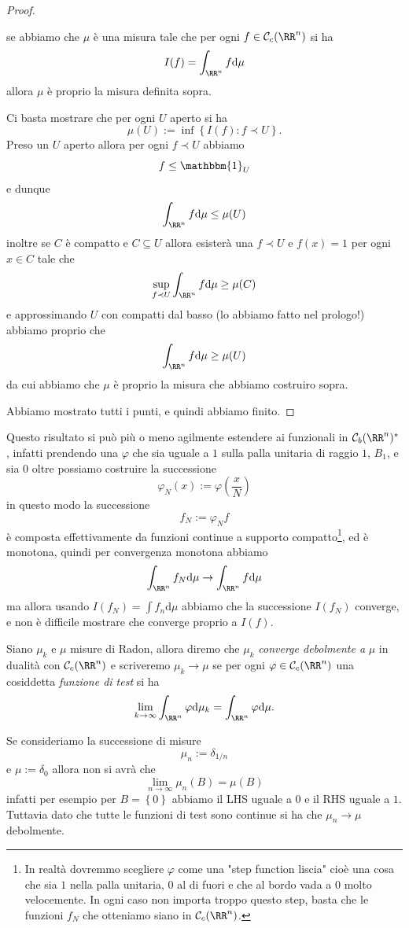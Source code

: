 \documentclass[11pt]{scrartcl}
\newcommand{\dif}{\text{d}}
\begin{document}
\begin{proof}
\begin{claim}
			se abbiamo che $\mu$ è una misura tale che per ogni $f\in \mathcal{C}_c(\RR^n)$ si ha
			$$I(f)=\int_{\RR^n} f\dif \mu$$
			allora $\mu$ è proprio la misura definita sopra.
		\end{claim}
		\begin{subproof}[Sottodimostrazione]
			Ci basta mostrare che per ogni $U$ aperto si ha
			$$\mu(U):=\inf \left\{I(f):f\prec U\right\}.$$
			Preso un $U$ aperto allora per ogni $f\prec U$ abbiamo 
			$$f\le \mathbbm{1}_U$$
			e dunque
			$$\int_{\RR^n}f\dif \mu \le \mu(U)$$
			inoltre se $C$ è compatto e $C\subseteq U$ allora esisterà una $f\prec U$ e $f(x)=1$ per ogni $x\in C$ tale che
			$$\sup_{f\prec U}\int_{\RR^n} f \dif \mu \ge \mu(C)$$
			e approssimando $U$ con compatti dal basso (lo abbiamo fatto nel prologo!) abbiamo proprio che
			$$\int_{\RR^n}f\dif \mu \ge \mu(U)$$
			da cui abbiamo che $\mu$ è proprio la misura che abbiamo costruiro sopra.
		\end{subproof}
		Abbiamo mostrato tutti i punti, e quindi abbiamo finito.
	\end{proof}
	Questo risultato si può più o meno agilmente estendere ai funzionali in $\mathcal{C}_b(\RR^n)^*$, infatti prendendo una $\varphi$ che sia uguale a $1$ sulla palla unitaria di raggio $1$, $B_1$, e sia $0$ oltre possiamo costruire la successione 
	$$\varphi_N(x):=\varphi\left(\frac{x}{N}\right)$$
	in questo modo la successione
	$$f_N:= \varphi_Nf$$
	è composta effettivamente da funzioni continue a supporto compatto\footnote{In realtà dovremmo scegliere $\varphi$ come una "step function liscia" cioè una cosa che sia $1$ nella palla unitaria, $0$ al di fuori e che al bordo vada a $0$ molto velocemente. In ogni caso non importa troppo questo step, basta che le funzioni $f_N$ che otteniamo siano in $\mathcal{C}_c(\RR^n)$.}, ed è monotona, quindi per convergenza monotona abbiamo
	$$\int_{\RR^n}f_N\dif \mu \to \int_{\RR^n}f\dif \mu $$
	ma allora usando $I(f_N)=\int f_n\dif \mu$ abbiamo che la successione $I(f_N)$ converge, e non è difficile mostrare che converge proprio a $I(f)$.
	\begin{definition}
		Siano $\mu_k$ e $\mu$ misure di Radon, allora diremo che $\mu_k$ \textit{converge debolmente a} $\mu$ in dualità con $\mathcal{C}_c(\RR^n)$ e scriveremo $\mu_k\to\mu$ se per ogni $\varphi\in \mathcal{C}_c(\RR^n)$ una cosiddetta \textit{funzione di test} si ha
		$$\lim_{k\to\infty}\int_{\RR^n} \varphi \dif \mu_k = \int_{\RR^n} \varphi \dif \mu.$$
	\end{definition}
	\begin{example}
		Se consideriamo la successione di misure
		$$\mu_n:=\delta_{1/n}$$
		e $\mu:=\delta_0$ allora non si avrà che
		$$\lim_{n\to\infty}\mu_n(B)=\mu(B)$$
		infatti per esempio per $B=\left\{0\right\}$ abbiamo il LHS uguale a $0$ e il RHS uguale a $1$. Tuttavia dato che tutte le funzioni di test sono continue si ha che $\mu_n\to \mu$ debolmente.
	\end{example}
\end{document}
